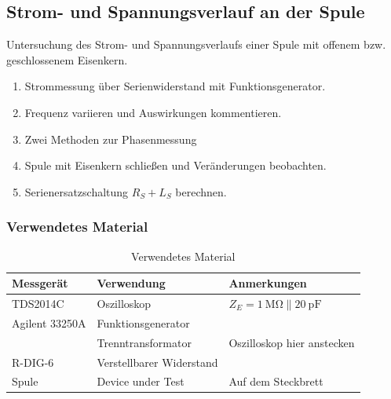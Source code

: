 \subsection{Strom- und Spannungsverlauf an der Spule}\label{sec:2-6}

\begin{highlightblock}
	Untersuchung des Strom- und Spannungsverlaufs einer Spule mit offenem bzw. geschlossenem Eisenkern.
	\begin{enumerate}[label=\textbf{\alph*:}, ref=\alph*, noitemsep]
		\item\label{itm:2-P6-1} Strommessung über Serienwiderstand mit Funktionsgenerator.
		\item\label{itm:2-P6-2} Frequenz variieren und Auswirkungen kommentieren.
		\item\label{itm:2-P6-3} Zwei Methoden zur Phasenmessung
		\item\label{itm:2-P6-4} Spule mit Eisenkern schließen und Veränderungen beobachten.
		\item\label{itm:2-P6-5} Serienersatzschaltung $R_S + L_S$ berechnen.
	\end{enumerate}
\end{highlightblock}

\subsubsection{Verwendetes Material}

\begin{table}[h]
	\centering
	\caption{Verwendetes Material}
	\begin{tabularx}{\textwidth}{XXX}
		\textbf{Messgerät} & \textbf{Verwendung}      & \textbf{Anmerkungen}                                   \\ \midrule
		TDS2014C           & Oszilloskop              & $Z_E = \SI{1}{\mega\ohm}\parallel\SI{20}{\pico\farad}$ \\
		Agilent 33250A     & Funktionsgenerator       &                                                        \\
					       & Trenntransformator       & Oszilloskop hier anstecken                             \\
		R-DIG-6            & Verstellbarer Widerstand &                                                        \\
		Spule              & Device under Test        & Auf dem Steckbrett                                     \\
	\end{tabularx}
\end{table}

